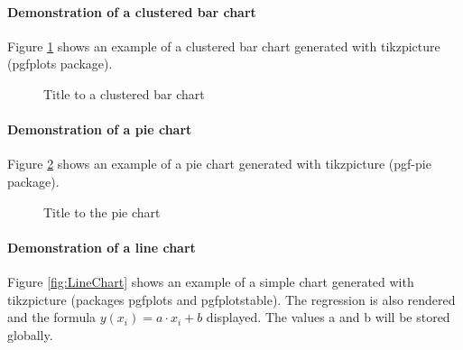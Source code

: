 \paragraph{Demonstration of a clustered bar chart}
Figure \ref{fig:ClusteredBarChart} shows an example of a clustered bar chart generated with tikzpicture (pgfplots package).

\begin{figure}
	\centering
	\caption{\label{fig:ClusteredBarChart}Title to a clustered bar chart}
\end{figure}

\paragraph{Demonstration of a pie chart}
Figure \ref{fig:PieChart} shows an example of a pie chart generated with tikzpicture (pgf-pie package).

\begin{figure}
	\centering
	\caption{\label{fig:PieChart}Title to the pie chart}
\end{figure}

\paragraph{Demonstration of a line chart}
Figure \ref{fig:LineChart} shows an example of a simple chart generated with tikzpicture (packages pgfplots and pgfplotstable). 
The regression is also rendered and the formula $ y(x_i) = a \cdot x_i + b$ displayed. The values a and b will be stored globally.


